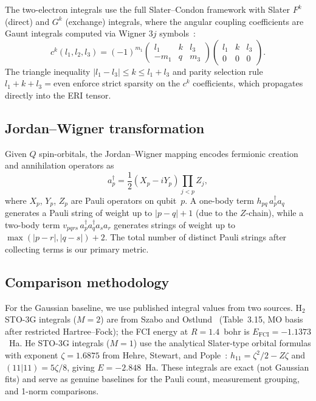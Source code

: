 \documentclass[aps,pra,twocolumn,superscriptaddress,longbibliography]{revtex4-2}
\begin{document}
The two-electron integrals use the full Slater--Condon framework with
Slater $F^k$ (direct) and $G^k$ (exchange) integrals, where the angular
coupling coefficients are Gaunt integrals computed via Wigner $3j$
symbols~\cite{loutey_paper13}:
\begin{equation}
  c^k(l_1, l_2, l_3) = (-1)^{m_1}
  \begin{pmatrix} l_1 & k & l_3 \\ -m_1 & q & m_3 \end{pmatrix}
  \begin{pmatrix} l_1 & k & l_3 \\ 0 & 0 & 0 \end{pmatrix}.
  \label{eq:gaunt}
\end{equation}
The triangle inequality $|l_1 - l_3| \le k \le l_1 + l_3$ and parity
selection rule $l_1 + k + l_3 = \text{even}$ enforce strict sparsity on
the $c^k$ coefficients, which propagates directly into the ERI tensor.

\subsection{Jordan--Wigner transformation}
\label{sec:jw}

Given $Q$ spin-orbitals, the Jordan--Wigner mapping encodes fermionic
creation and annihilation operators as~\cite{jordan1928}
\begin{equation}
  a^\dagger_p = \frac{1}{2}(X_p - iY_p) \prod_{j<p} Z_j,
  \label{eq:jw}
\end{equation}
where $X_p$, $Y_p$, $Z_p$ are Pauli operators on qubit~$p$.  A one-body
term $h_{pq}\, a^\dagger_p a_q$ generates a Pauli string of weight up to
$|p - q| + 1$ (due to the $Z$-chain), while a two-body term
$v_{pqrs}\, a^\dagger_p a^\dagger_q a_s a_r$ generates strings of weight
up to $\max(|p-r|, |q-s|) + 2$.  The total number of distinct Pauli
strings after collecting terms is our primary metric.

\subsection{Comparison methodology}
\label{sec:comparison}

For the Gaussian baseline, we use published integral values from two
sources.  H$_2$ STO-3G integrals ($M = 2$) are from Szabo and
Ostlund~\cite{szabo1996} (Table~3.15, MO basis after restricted
Hartree--Fock); the FCI energy at $R = 1.4$~bohr is
$E_{\mathrm{FCI}} = -1.1373$~Ha.  He STO-3G integrals ($M = 1$) use
the analytical Slater-type orbital formulas with exponent
$\zeta = 1.6875$ from Hehre, Stewart, and Pople~\cite{hehre1969}:
$h_{11} = \zeta^2/2 - Z\zeta$ and $(11|11) = 5\zeta/8$, giving
$E = -2.848$~Ha.  These integrals are exact (not Gaussian fits) and
serve as genuine baselines for the Pauli count, measurement grouping,
and 1-norm comparisons.
\end{document}

